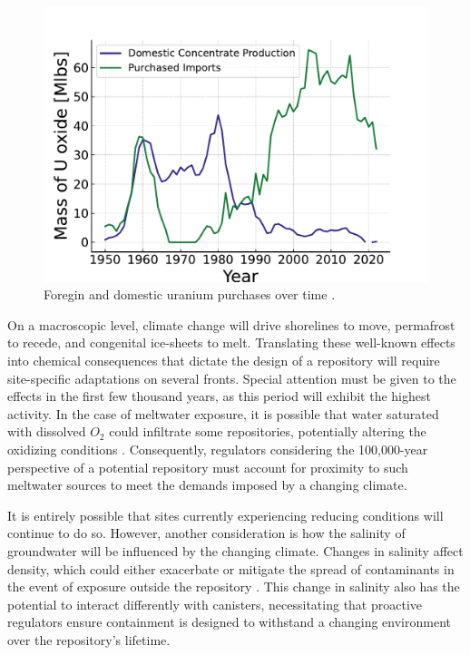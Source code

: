 \begin{figure}[h]
   \centering
   \includegraphics[scale=0.8]{images/intro/uranium_production_imports.pdf}
   \caption{Foregin and domestic uranium purchases over time \cite{eia_monthly_energy_review_2024}.}
   \label{fig:foregin_u3o8}
\end{figure}








On a macroscopic level, climate change will drive shorelines to move, permafrost to recede, and congenital ice-sheets to melt. Translating these well-known effects into chemical consequences that dictate the design of a repository will require site-specific adaptations on several fronts. Special attention must be given to the effects in the first few thousand years, as this period will exhibit the highest activity. In the case of meltwater exposure, it is possible that water saturated with dissolved $O_2$ could infiltrate some repositories, potentially altering the oxidizing conditions \cite{gurban_hydrochemical_2001}. Consequently, regulators considering the 100,000-year perspective of a potential repository must account for proximity to such meltwater sources to meet the demands imposed by a changing climate.

It is entirely possible that sites currently experiencing reducing conditions will continue to do so. However, another consideration is how the salinity of groundwater will be influenced by the changing climate. Changes in salinity affect density, which could either exacerbate or mitigate the spread of contaminants in the event of exposure outside the repository \cite{gurban_hydrochemical_2001}. This change in salinity also has the potential to interact differently with canisters, necessitating that proactive regulators ensure containment is designed to withstand a changing environment over the repository's lifetime.

